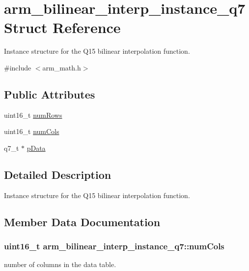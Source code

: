 \hypertarget{structarm__bilinear__interp__instance__q7}{}\section{arm\+\_\+bilinear\+\_\+interp\+\_\+instance\+\_\+q7 Struct Reference}
\label{structarm__bilinear__interp__instance__q7}


Instance structure for the Q15 bilinear interpolation function.  




{\ttfamily \#include $<$arm\+\_\+math.\+h$>$}

\subsection*{Public Attributes}
\begin{DoxyCompactItemize}
\item 
uint16\+\_\+t \hyperlink{structarm__bilinear__interp__instance__q7_ad5a8067cab5f9ea4688b11a623e16607}{num\+Rows}
\item 
uint16\+\_\+t \hyperlink{structarm__bilinear__interp__instance__q7_a860dd0d24380ea06cfbb348fb3b12c9a}{num\+Cols}
\item 
q7\+\_\+t $\ast$ \hyperlink{structarm__bilinear__interp__instance__q7_af05194d691bbefb02c34bafb22ca9ef0}{p\+Data}
\end{DoxyCompactItemize}


\subsection{Detailed Description}
Instance structure for the Q15 bilinear interpolation function. 

\subsection{Member Data Documentation}
\subsubsection[{\texorpdfstring{num\+Cols}{numCols}}]{\setlength{\rightskip}{0pt plus 5cm}uint16\+\_\+t arm\+\_\+bilinear\+\_\+interp\+\_\+instance\+\_\+q7\+::num\+Cols}\hypertarget{structarm__bilinear__interp__instance__q7_a860dd0d24380ea06cfbb348fb3b12c9a}{}\label{structarm__bilinear__interp__instance__q7_a860dd0d24380ea06cfbb348fb3b12c9a}
number of columns in the data table. 
